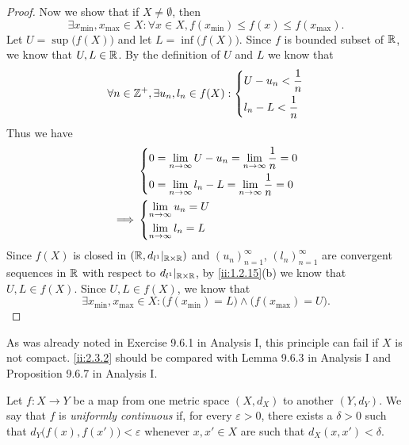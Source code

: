 \begin{proof}
  Now we show that if \(X \neq \emptyset\), then
  \[
    \exists x_{\min}, x_{\max} \in X : \forall x \in X, f(x_{\min}) \leq f(x) \leq f(x_{\max}).
  \]
  Let \(U = \sup\big(f(X)\big)\) and let \(L = \inf\big(f(X)\big)\).
  Since \(f\) is bounded subset of \(\mathbb{R}\), we know that \(U, L \in \mathbb{R}\).
  By the definition of \(U\) and \(L\) we know that
  \[
    \forall n \in \mathbb{Z}^+, \exists u_n, l_n \in f(X) : \begin{dcases}
      U - u_n < \dfrac{1}{n} \\
      l_n - L < \dfrac{1}{n}
    \end{dcases}
  \]
  Thus we have
  \begin{align*}
             & \begin{dcases}
                 0 = \lim_{n \to \infty} U - u_n = \lim_{n \to \infty} \dfrac{1}{n} = 0 \\
                 0 = \lim_{n \to \infty} l_n - L = \lim_{n \to \infty} \dfrac{1}{n} = 0
               \end{dcases} \\
    \implies & \begin{dcases}
                 \lim_{n \to \infty} u_n = U \\
                 \lim_{n \to \infty} l_n = L
               \end{dcases}
  \end{align*}
  Since \(f(X)\) is closed in \((\mathbb{R}, d_{l^1}|_{\mathbb{R} \times \mathbb{R}})\) and \((u_n)_{n = 1}^\infty\), \((l_n)_{n = 1}^\infty\) are convergent sequences in \(\mathbb{R}\) with respect to \(d_{l^1}|_{\mathbb{R} \times \mathbb{R}}\), by \cref{ii:1.2.15}(b) we know that \(U, L \in f(X)\).
  Since \(U, L \in f(X)\), we know that
  \[
    \exists x_{\min}, x_{\max} \in X : \big(f(x_{\min}) = L\big) \land \big(f(x_{\max}) = U\big).
  \]
\end{proof}

\begin{rmk}\label{ii:2.3.3}
  As was already noted in Exercise 9.6.1 in Analysis I, this principle can fail if \(X\) is not compact.
  \cref{ii:2.3.2} should be compared with Lemma 9.6.3 in Analysis I and Proposition 9.6.7 in Analysis I.
\end{rmk}

\begin{defn}\label{ii:2.3.4}
  Let \(f : X \to Y\) be a map from one metric space \((X, d_X)\) to another \((Y, d_Y)\).
  We say that \(f\) is \emph{uniformly continuous} if, for every \(\varepsilon > 0\), there exists a \(\delta > 0\) such that \(d_Y\big(f(x), f(x')\big) < \varepsilon\) whenever \(x, x' \in X\) are such that \(d_X(x, x') < \delta\).
\end{defn}


